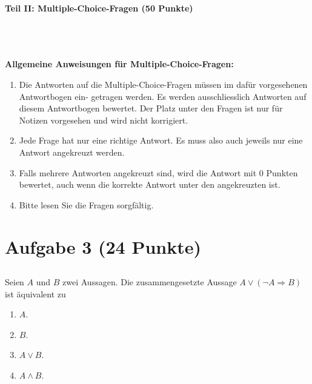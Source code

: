 \begin{Large}
\textbf{Teil II: Multiple-Choice-Fragen (50 Punkte)}
\end{Large}
\\
\\
\\
\textbf{Allgemeine Anweisungen für Multiple-Choice-Fragen:}
\\
\renewcommand{\labelenumi}{(\roman{enumi})}
\begin{enumerate}
\item
Die Antworten auf die Multiple-Choice-Fragen müssen im dafür vorgesehenen Antwortbogen ein-
getragen werden. Es werden ausschliesslich Antworten auf diesem Antwortbogen bewertet. Der
Platz unter den Fragen ist nur für Notizen vorgesehen und wird nicht korrigiert.

\item
Jede Frage hat nur eine richtige Antwort. Es muss also auch jeweils nur eine Antwort angekreuzt
werden.

\item
Falls mehrere Antworten angekreuzt sind, wird die Antwort mit 0 Punkten bewertet, auch wenn
die korrekte Antwort unter den angekreuzten ist.

\item
Bitte lesen Sie die Fragen sorgfältig.

\end{enumerate}
\newpage
\section*{Aufgabe 3 (24 Punkte)}
\vspace{0.4cm}
\subsection*{}
Seien $ A $ und $ B $ zwei Aussagen. Die zusammengesetzte Aussage $ A \vee (\neg A \Rightarrow B) $ ist äquivalent zu
\renewcommand{\labelenumi}{(\alph{enumi})}
\begin{enumerate}
\item $ A $.
\item $ B $.
\item $ A \vee B $.
\item $ A \wedge B $.
\end{enumerate}
\ \\
